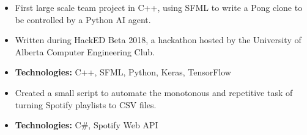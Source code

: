 \documentclass[10pt,letterpaper,ragged2e]{altacv}
\begin{document}
\begin{itemize}
  \item First large scale team project in C++, using SFML to write a Pong clone to be controlled by a Python AI agent.
  \item Written during HackED Beta 2018, a hackathon hosted by the University of Alberta Computer Engineering Club.
  \item \textbf{Technologies:} C++, SFML, Python, Keras, TensorFlow
\end{itemize}
\divider\small

\begin{itemize}
  \item Created a small script to automate the monotonous and repetitive task of turning Spotify playlists to CSV files.
  \item \textbf{Technologies:} C\#, Spotify Web API
\end{itemize}
\divider\small
\clearpage
\nocite{*}
\end{document}
